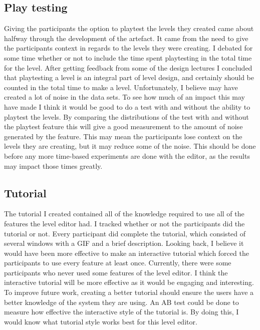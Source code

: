 \documentclass[journal]{IEEEtran}
\begin{document}
\subsection{Play testing}\label{ptest}
Giving the participants the option to playtest the levels they created came about halfway through the development of the artefact. It came from the need to give the participants context in regards to the levels they were creating. I debated for some time whether or not to include the time spent playtesting in the total time for the level. After getting feedback from some of the design lectures I concluded that playtesting a level is an integral part of level design, and certainly should be counted in the total time to make a level. Unfortunately, I believe may have created a lot of noise in the data sets. To see how much of an impact this may have made I think it would be good to do a test with and without the ability to playtest the levels. By comparing the distributions of the test with and without the playtest feature this will give a good measurement to the amount of noise generated by the feature. This may mean the participants lose context on the levels they are creating, but it may reduce some of the noise. This should be done before any more time-based experiments are done with the editor, as the results may impact those times greatly.

\subsection{Tutorial}
The tutorial I created contained all of the knowledge required to use all of the features the level editor had. I tracked whether or not the participants did the tutorial or not. Every participant did complete the tutorial, which consisted of several windows with a GIF and a brief description. Looking back, I believe it would have been more effective to make an interactive tutorial which forced the participants to use every feature at least once. Currently, there were some participants who never used some features of the level editor. I think the interactive tutorial will be more effective as it would be engaging and interesting. To improve future work, creating a better tutorial should ensure the users have a better knowledge of the system they are using. An AB test could be done to measure how effective the interactive style of the tutorial is. By doing this, I would know what tutorial style works best for this level editor. 

\end{document}
